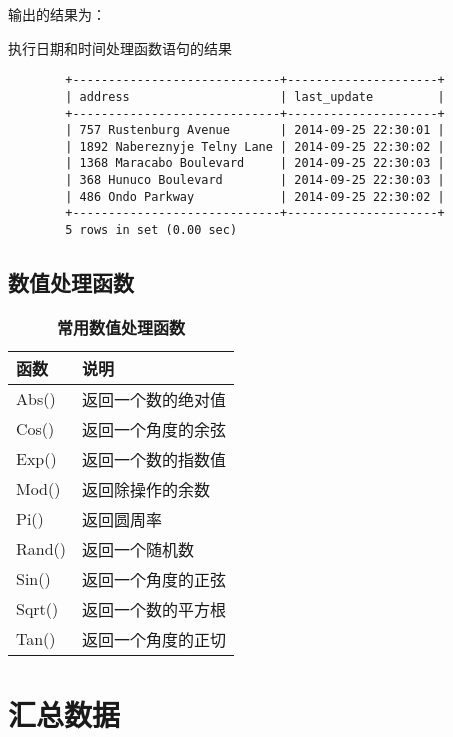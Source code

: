 \documentclass[UTF8]{article}
\begin{document}
输出的结果为：

\begin{listing}[H]
	\caption{执行日期和时间处理函数语句的结果}
	\label{code:conductdatetimefunctionclauseresult}
\begin{verbatim}
        +-----------------------------+---------------------+
        | address                     | last_update         |
        +-----------------------------+---------------------+
        | 757 Rustenburg Avenue       | 2014-09-25 22:30:01 |
        | 1892 Nabereznyje Telny Lane | 2014-09-25 22:30:02 |
        | 1368 Maracabo Boulevard     | 2014-09-25 22:30:03 |
        | 368 Hunuco Boulevard        | 2014-09-25 22:30:03 |
        | 486 Ondo Parkway            | 2014-09-25 22:30:02 |
        +-----------------------------+---------------------+
        5 rows in set (0.00 sec)
\end{verbatim}
\end{listing}

\subsection{数值处理函数}

\begin{table}[H]
        \caption{\textbf{常用数值处理函数}}%
        \centering%
        \begin{tabular}{ll}%
        \toprule%
        函数&说明\\
        \midrule%
        Abs()  & 返回一个数的绝对值     \\ 
        Cos()  & 返回一个角度的余弦     \\ 
        Exp()  & 返回一个数的指数值     \\ 
        Mod()  & 返回除操作的余数       \\ 
        Pi()   & 返回圆周率             \\ 
        Rand() & 返回一个随机数         \\ 
        Sin()  & 返回一个角度的正弦     \\ 
        Sqrt() & 返回一个数的平方根     \\ 
        Tan()  & 返回一个角度的正切     \\ 
        \bottomrule%
        \end{tabular}
\end{table}  

\section{汇总数据}
\end{document}

